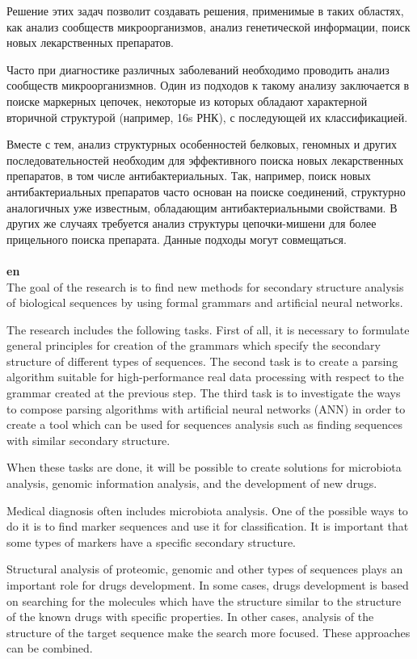 \documentclass[12pt]{article}  %
\theoremstyle{remark}
\begin{document}
Решение этих задач позволит создавать решения, применимые в таких областях, как анализ сообществ микроорганизмов, анализ генетической информации, поиск новых лекарственных препаратов.

Часто при диагностике различных заболеваний необходимо проводить анализ сообществ микроорганизмнов. Один из подходов к такому анализу заключается в поиске маркерных цепочек, некоторые из которых обладают характерной вторичной структурой (например, 16s РНК), с последующей их классификацией.

Вместе с тем, анализ структурных особенностей белковых, геномных и других последовательностей необходим для эффективного поиска новых лекарственных препаратов, в том числе антибактериальных. Так, например, поиск новых антибактериальных препаратов часто основан на поиске соединений, структурно аналогичных уже известным, обладающим антибактериальными свойствами. В других же случаях требуется анализ структуры цепочки-мишени для более прицельного поиска препарата. Данные подходы могут совмещаться.
\\
\\
\textbf{en}\\
The goal of the research is to find new methods for secondary structure analysis of biological sequences by using formal grammars and artificial neural networks.

The research includes the following tasks.
First of all, it is necessary to formulate general principles for creation of the grammars which specify the secondary structure of different types of sequences.
The second task is to create a parsing algorithm suitable for high-performance real data processing with respect to the grammar created at the previous step.
The third task is to investigate the ways to compose parsing algorithms with artificial neural networks (ANN) in order to create a tool which can be used for sequences analysis such as finding sequences with similar secondary structure.

When these tasks are done, it will be possible to create solutions for microbiota analysis, genomic information analysis, and the development of new drugs.

Medical diagnosis often includes microbiota analysis. One of the possible ways to do it is to find marker sequences and use it for classification. It is important that some types of markers have a specific secondary structure.

Structural analysis of proteomic, genomic and other types of sequences plays an important role for drugs development. In some cases, drugs development is based on searching for the molecules which have the structure similar to the structure of the known drugs with specific properties. In other cases, analysis of the structure of the target sequence make the search more focused. These approaches can be combined.
\end{document}
